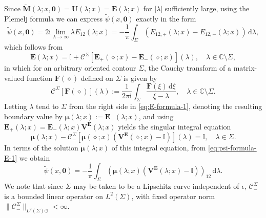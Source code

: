 \documentclass[12pt]{amsart}
\numberwithin{equation}{section}
\newcommand{\dd}{\mathrm{d}}
\newcommand{\ii}{\mathrm{i}}
\newcommand{\SP}{\lambda}
\begin{document}
Since $\widetilde{\mathbf{M}}(\SP;x,\mathbf{0})=\mathbf{U}(\SP;x)=\mathbf{E}(\SP;x)$ for $|\SP|$ sufficiently large, using the Plemelj formula we can express $\widetilde{\psi}(x,\mathbf{0})$ exactly in the form
\begin{equation}
\widetilde{\psi}(x,\mathbf{0})=2\ii\lim_{\SP\to\infty}\SP E_{12}(\SP;x) = -\frac{1}{\pi}\int_{\Sigma}(E_{12,+}(\SP;x)-E_{12,-}(\SP;x))\,\dd\SP,
\label{eq:psi-formula-E-1}
\end{equation}
which follows from
\begin{equation}
\mathbf{E}(\SP;x)=\mathbb{I}+\mathcal{C}^{\Sigma}[\mathbf{E}_+(\diamond;x)-\mathbf{E}_-(\diamond;x)](\SP),\quad\lambda\in\mathbb{C}\setminus\Sigma,
\label{eq:E-formula-1}
\end{equation}
in which for an arbitrary oriented contour $\Sigma$, the Cauchy transform of a matrix-valued function $\mathbf{F}(\diamond)$ defined on $\Sigma$ is given by
\begin{equation}
\mathcal{C}^\Sigma[\mathbf{F}(\diamond)](\SP):=\frac{1}{2\pi\ii}\int_\Sigma\frac{\mathbf{F}(\xi)\,\dd\xi}{\xi-\SP},\quad\SP\in\mathbb{C}\setminus \Sigma.
\end{equation}
Letting $\SP$ tend to $\Sigma$ from the right side in \eqref{eq:E-formula-1}, denoting the resulting boundary value by $\boldsymbol{\mu}(\SP;x):=\mathbf{E}_-(\SP;x)$, and using $\mathbf{E}_+(\SP;x)=\mathbf{E}_-(\SP;x)\mathbf{V}^\mathbf{E}(\SP;x)$ yields the singular integral equation
\begin{equation}
\boldsymbol{\mu}(\SP;x)-\mathcal{C}_-^\Sigma[\boldsymbol{\mu}(\diamond;x)(\mathbf{V}^\mathbf{E}(\diamond;x)-\mathbb{I})](\SP)=\mathbb{I},\quad\SP\in\Sigma.
\label{eq:sing-int}
\end{equation}
In terms of the solution $\boldsymbol{\mu}(\SP;x)$ of this integral equation, from \eqref{eq:psi-formula-E-1} we obtain
\begin{equation}
\widetilde{\psi}(x,\mathbf{0})=-\frac{1}{\pi}\int_\Sigma (\boldsymbol{\mu}(\SP;x)(\mathbf{V}^\mathbf{E}(\SP;x)-\mathbb{I}))_{12}\,\dd\SP.
\label{eq:psi-formula-mu}
\end{equation}
We note that since $\Sigma$ may be taken to be a Lipschitz curve independent of $\epsilon$, $\mathcal{C}_-^\Sigma$ is a bounded linear operator on $L^2(\Sigma)$, with fixed operator norm $\|\mathcal{C}_-^\Sigma\|_{L^2(\Sigma)\circlearrowleft}<\infty$.
\end{document}
